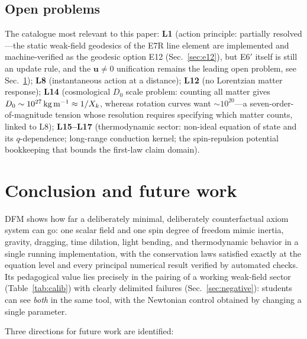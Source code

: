 \documentclass[aps,reprint,amsmath,amssymb,nofootinbib,superscriptaddress,floatfix]{revtex4-2}
\newcommand{\vect}[1]{\bm{#1}}
\newcommand{\Kt}{X_k}
\newcommand{\Dz}{D_0}
\begin{document}
\subsection{Open problems}
\label{sec:limits}

The catalogue most relevant to this paper:
{\bf L1} (action principle: partially resolved---the static
weak-field geodesics of the E7R line element are implemented and
machine-verified as the geodesic option E12 (Sec.~\ref{sec:e12}),
but E6$'$ itself is still an update rule, and the $\vect{u}\ne0$
unification remains the leading open problem, see
Sec.~\ref{sec:conclusion});
{\bf L8} (instantaneous action at a distance);
{\bf L12} (no Lorentzian matter response);
{\bf L14} (cosmological $\Dz$ scale problem: counting all matter gives
$\Dz \sim 10^{27}\,{\rm kg\,m^{-1}} \approx 1/\Kt$, whereas rotation
curves want $\sim10^{20}$---a seven-order-of-magnitude tension whose
resolution requires specifying which matter counts, linked to L8);
{\bf L15--L17} (thermodynamic sector: non-ideal equation of state and
its $q$-dependence; long-range conduction kernel; the spin-repulsion
potential bookkeeping that bounds the first-law claim domain).

\section{Conclusion and future work}
\label{sec:conclusion}

DFM shows how far a deliberately minimal, deliberately counterfactual
axiom system can go: one scalar field and one spin degree of freedom
mimic inertia, gravity, dragging, time dilation, light bending, and
thermodynamic behavior in a single running implementation, with the
conservation laws satisfied exactly at the equation level and every
principal numerical result verified by automated checks.
Its pedagogical value lies precisely in the pairing of a working
weak-field sector (Table~\ref{tab:calib}) with clearly delimited
failures (Sec.~\ref{sec:negative}): students can see \emph{both} in
the same tool, with the Newtonian control obtained by changing a
single parameter.

Three directions for future work are identified:
\end{document}

